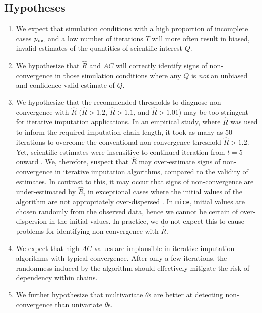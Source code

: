 \documentclass[Royal,times,sageh]{sagej}
\begin{document}
\hypertarget{hypotheses}{%
\subsection{Hypotheses}\label{hypotheses}}

\begin{enumerate}
\def\labelenumi{\arabic{enumi}.}
\item
  We expect that simulation conditions with a high proportion of incomplete cases \(p_{\rm inc}\) and a low number of iterations \(T\) will more often result in biased, invalid estimates of the quantities of scientific interest \(Q\).
\item
  We hypothesize that \(\widehat{R}\) and \(AC\) will correctly identify signs of non-convergence in those simulation conditions where any \(\bar{Q}\) is \emph{not} an unbiased and confidence-valid estimate of \(Q\).
\item
  We hypothesize that the recommended thresholds to diagnose non-convergence with \(\widehat{R}\) (\(\widehat{R} > 1.2\), \(\widehat{R} > 1.1\), and \(\widehat{R} > 1.01\)) may be too stringent for iterative imputation applications. In an empirical study, where \(\widehat{R}\) was used to inform the required imputation chain length, it took as many as 50 iterations to overcome the conventional non-convergence threshold \(\widehat{R}>1.2\). Yet, scientific estimates were insensitive to continued iteration from \(t=5\) onward \citep{lace07}. We, therefore, suspect that \(\widehat{R}\) may over-estimate signs of non-convergence in iterative imputation algorithms, compared to the validity of estimates. In contrast to this, it may occur that signs of non-convergence are under-estimated by \(\widehat{R}\), in exceptional cases where the initial values of the algorithm are not appropriately over-dispersed \citep[p.~437]{broo98}. In \texttt{mice}, initial values are chosen randomly from the observed data, hence we cannot be certain of over-dispersion in the initial values. In practice, we do not expect this to cause problems for identifying non-convergence with \(\widehat{R}\).
\item
  We expect that high \(AC\) values are implausible in iterative imputation algorithms with typical convergence. After only a few iterations, the randomness induced by the algorithm should effectively mitigate the risk of dependency within chains.
\item
  We further hypothesize that multivariate \(\theta\)s are better at detecting non-convergence than univariate \(\theta\)s.
\end{enumerate}
\end{document}
